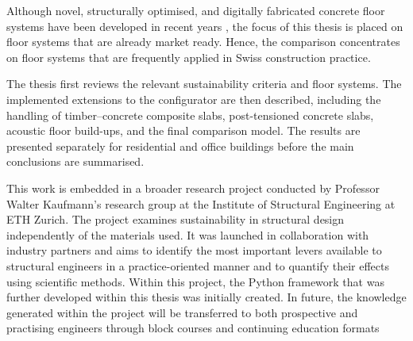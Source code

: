 Although novel, structurally optimised, and digitally fabricated concrete floor systems have been developed in recent years \cite{Wangler2019, Menna2020}, the focus of this thesis is placed on floor systems that are already market ready. Hence, the comparison concentrates on floor systems that are frequently applied in Swiss construction practice.

The thesis first reviews the relevant sustainability criteria and floor systems. The implemented extensions to the configurator are then described, including the handling of timber--concrete composite slabs, post-tensioned concrete slabs, acoustic floor build-ups, and the final comparison model. The results are presented separately for residential and office buildings before the main conclusions are summarised.

This work is embedded in a broader research project conducted by Professor Walter Kaufmann’s research group at the Institute of Structural Engineering at ETH Zurich. The project examines sustainability in structural design independently of the materials used. It was launched in collaboration with industry partners and aims to identify the most important levers available to structural engineers in a practice-oriented manner and to quantify their effects using scientific methods. Within this project, the Python framework that was further developed within this thesis was initially created. In future, the knowledge generated within the project will be transferred to both prospective and practising engineers through block courses and continuing education formats \cite{kfmResearch2026}


